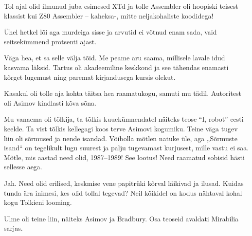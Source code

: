Tol ajal olid ilmunud juba esimesed XTd ja tolle 
Assembler oli hoopiski teisest klassist kui Z80 Assembler – kaheksa-, mitte neljakohaliste koodidega! 

Ühel hetkel lõi aga murdeiga sisse ja arvutid ei võtnud enam sada, vaid seitsekümmend protsenti ajast. 


Väga hea, et sa selle välja tõid. Me peame aru saama, millisele lavale 
idud kasvama läksid. Tartus oli akadeemiline keskkond ja see tähendas 
enamasti kõrget lugemust ning paremat kirjandusega kursis olekut.

Kasakul oli tolle aja kohta täitsa hea raamatukogu, 
samuti mu tädil. Autoritest oli Asimov 
kindlasti kõva sõna. 

Mu vanaema oli tõlkija, ta tõlkis kuuekümnendatel näiteks teose \enquote{I, 
robot} eesti keelde. Ta vist tõlkis kellegagi koos terve Asimovi 
kogumiku. Teine väga tugev liin oli sõrmused ja nende 
isandad. 
Võibolla mõtlen natuke üle, aga „Sõrmuste isand“ on tegelikult lugu suurest ja palju tugevamast kurjusest, mille 
vastu ei saa. Mõtle, mis aastad need olid, 1987–1989! See lootus! Need 
raamatud sobisid hästi sellesse aega.


Jah. Need olid erilised, keskmise vene papitrüki kõrval läikivad ja ilusad. Kuidas tunda ära 
inimesi, kes olid tollal tegevad? Neil kõikidel on kodus nähtaval kohal kogu Tolkieni looming.

Ulme oli teine liin, näiteks Asimov ja Bradbury. Osa teoseid avaldati Mirabilia sarjas. 


